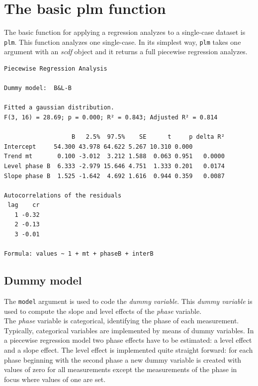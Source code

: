 \documentclass[
]{book}
\newenvironment{Shaded}{\begin{snugshade}}{\end{snugshade}}
\newcommand{\FunctionTok}[1]{\textcolor[rgb]{0.00,0.00,0.00}{#1}}
\newcommand{\NormalTok}[1]{#1}
\newcommand{\SpecialCharTok}[1]{\textcolor[rgb]{0.00,0.00,0.00}{#1}}
\begin{document}
\hypertarget{the-basic-plm-function}{%
\section{The basic plm function}\label{the-basic-plm-function}}

The basic function for applying a regression analyzes to a single-case dataset is \texttt{plm}. This function analyzes one single-case. In its simplest way, \texttt{plm} takes one argument with an \emph{scdf} object and it returns a full piecewise regression analyzes.

\begin{Shaded}
\end{Shaded}

\begin{verbatim}
Piecewise Regression Analysis

Dummy model:  B&L-B 

Fitted a gaussian distribution.
F(3, 16) = 28.69; p = 0.000; R² = 0.843; Adjusted R² = 0.814

                   B   2.5%  97.5%    SE      t     p delta R²
Intercept     54.300 43.978 64.622 5.267 10.310 0.000         
Trend mt       0.100 -3.012  3.212 1.588  0.063 0.951   0.0000
Level phase B  6.333 -2.979 15.646 4.751  1.333 0.201   0.0174
Slope phase B  1.525 -1.642  4.692 1.616  0.944 0.359   0.0087

Autocorrelations of the residuals
 lag    cr
   1 -0.32
   2 -0.13
   3 -0.01

Formula: values ~ 1 + mt + phaseB + interB
\end{verbatim}

\hypertarget{dummy-model}{%
\subsection{Dummy model}\label{dummy-model}}

The \texttt{model} argument is used to code the \emph{dummy variable}. This \emph{dummy variable} is used to compute the slope and level effects of the \emph{phase} variable.\\
The \emph{phase} variable is categorical, identifying the phase of each measurement. Typically, categorical variables are implemented by means of dummy variables. In a piecewise regression model two phase effects have to be estimated: a level effect and a slope effect. The level effect is implemented quite straight forward: for each phase beginning with the second phase a new dummy variable is created with values of zero for all measurements except the measurements of the phase in focus where values of one are set.
\end{document}
